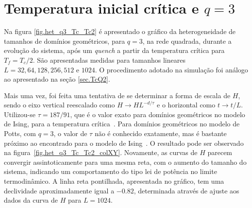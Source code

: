 \section{Temperatura inicial crítica e $q=3$}
\label{sec.TcQ3}

Na figura \ref{fig.het_q3_Tc_Tc2} é apresentado o gráfico da heterogeneidade de tamanhos de domínios geométricos, para $q=3$, na rede quadrada, durante a evolução do sistema, após um \textit{quench} a partir da temperatura crítica para $T_f=T_c/2$. São apresentadas medidas para tamanhos lineares $L=32, 64, 128, 256, 512$ e $1024$. O procedimento adotado na simulação foi análogo ao apresentado na seção \ref{sec.TcQ2}.

Mais uma vez, foi feita uma tentativa de se determinar a forma de escala de $H$, sendo o eixo vertical reescalado como $H \rightarrow HL^{-d/\tau}$ e o horizontal como $t \rightarrow t/L$. Utilizou-se $\tau = 187/91$, que é o valor exato para domínios geométricos no modelo de Ising, para a temperatura crítica~\cite{PRLJeferson,PREJeferson}. Para domínios geométricos no modelo de Potts, com $q=3$, o valor de $\tau$ não é conhecido exatamente, mas é bastante próximo ao encontrado para o modelo de Ising~\cite{LoureiroPRE}. O resultado pode ser observado na figura~\ref{fig.het_q3_Tc_Tc2_colXY}. Novamente, as curvas de $H$ parecem convergir assintoticamente para uma mesma reta, com o aumento do tamanho do sistema, indicando um comportamento do tipo lei de potência no limite termodinâmico. A linha reta pontilhada, apresentada no gráfico, tem uma declividade aproximadamente igual a $-0.82$, determinada através de ajuste aos dados da curva de $H$ para $L=1024$.

